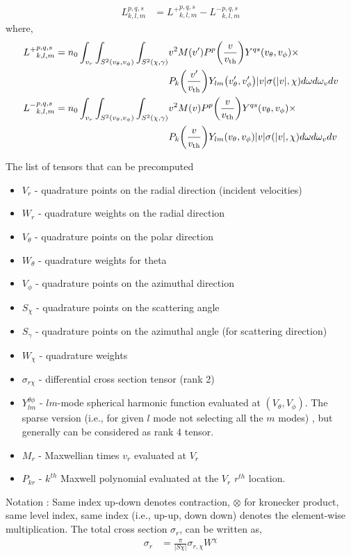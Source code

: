 \documentclass{article}
\newcommand{\of}[1]{\mleft( #1 \mright)}
\newcommand{\vth}{v_\textrm{th}}
\begin{document}
\begin{align*}
    {L}_{k,l,m}^{p,q,s} &= {L^{+}}_{k,l,m}^{p,q,s} - {L^{-}}_{k,l,m}^{p,q,s}
\end{align*} where, 
\begin{align*}
    {L^{+}}_{k,l,m}^{p,q,s} = n_0 \int_{v_r} 
                               \int_{S^2(v_\theta,v_\phi)}
                               \int_{S^2(\chi,\gamma)} & 
                               v^2 M(v^\prime) P^p \of{\frac{v}{\vth}} Y^{qs}\of{v_\theta, v_\phi} \times \\ & P_k\of{\frac{v^\prime}{\vth}} Y_{lm}\of{v_\theta^\prime, v_\phi^\prime} |v|\sigma(|v|,\chi) d\omega d\omega_v dv \\
    {L^{-}}_{k,l,m}^{p,q,s} = n_0 \int_{v_r} 
                              \int_{S^2(v_\theta,v_\phi)}
                              \int_{S^2(\chi,\gamma)} & 
                              v^2 M(v) P^p \of{\frac{v}{\vth}} Y^{qs}\of{v_\theta, v_\phi} \times \\ & P_k\of{\frac{v}{\vth}} Y_{lm}\of{v_\theta, v_\phi} |v|\sigma(|v|,\chi) d\omega d\omega_v dv
\end{align*}

The list of tensors that can be precomputed
\begin{itemize}
    \item $V_r$ - quadrature points on the radial direction (incident velocities)
    \item $W_r$ - quadrature weights on the radial direction
    \item $V_\theta$ - quadrature points on the polar direction 
    \item $W_\theta$ - quadrature weights for theta
    \item $V_\phi$ - quadrature points on the azimuthal direction 
    \item $S_\chi$ - quadrature points on the scattering angle
    \item $S_\gamma$ - quadrature points on the azimuthal angle (for scattering direction)
    \item $W_\chi$ - quadrature weights
    \item $\sigma_{r\chi}$ - differential cross section tensor (rank 2)
    \item $Y_{lm}^{\theta\phi}$ - $lm$-mode spherical harmonic function evaluated at $(V_\theta, V_\phi)$. The sparse version (i.e., for given $l$ mode not selecting all the $m$ modes) , but generally can be considered as rank 4 tensor. 
    \item $M_r$ - Maxwellian times $v_r$ evaluated at $V_r$
    \item $P_{kr}$     - $k^{th}$ Maxwell polynomial evaluated at the $V_r$ $r^{th}$ location.
\end{itemize}
Notation : Same index up-down denotes contraction, $\otimes$ for kronecker product, same level index, same index (i.e., up-up, down down) denotes the element-wise multiplication. 
The total cross section $\sigma_r$, can be written as, 
\begin{align}
    \sigma_r &= \frac{\pi}{|S\chi|} \sigma_{r,\chi} W^\chi
\end{align}
\end{document}
